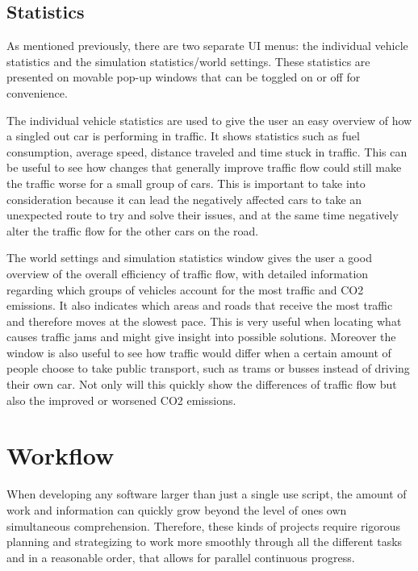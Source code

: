     \subsection{Statistics}
        As mentioned previously, there are two separate UI menus: the individual vehicle statistics and the simulation statistics/world settings. These statistics are presented on movable pop-up windows that can be toggled on or off for convenience.

        The individual vehicle statistics are used to give the user an easy overview of how a singled out car is performing in traffic. It shows statistics such as fuel consumption, average speed, distance traveled and time stuck in traffic. This can be useful to see how changes that generally improve traffic flow could still make the traffic worse for a small group of cars. This is important to take into consideration because it can lead the negatively affected cars to take an unexpected route to try and solve their issues, and at the same time negatively alter the traffic flow for the other cars on the road.

        The world settings and simulation statistics window gives the user a good overview of the overall efficiency of traffic flow, with detailed information regarding which groups of vehicles account for the most traffic and CO2 emissions. It also indicates which areas and roads that receive the most traffic and therefore moves at the slowest pace. This is very useful when locating what causes traffic jams and might give insight into possible solutions. Moreover the window is also useful to see how traffic would differ when a certain amount of people choose to take public transport, such as trams or busses instead of driving their own car. Not only will this quickly show the differences of traffic flow but also the improved or worsened CO2 emissions.

\section{Workflow}
    When developing any software larger than just a single use script, the amount of work and information can quickly grow beyond the level of ones own simultaneous comprehension. Therefore, these kinds of projects require rigorous planning and strategizing to work more smoothly through all the different tasks and in a reasonable order, that allows for parallel continuous progress.

